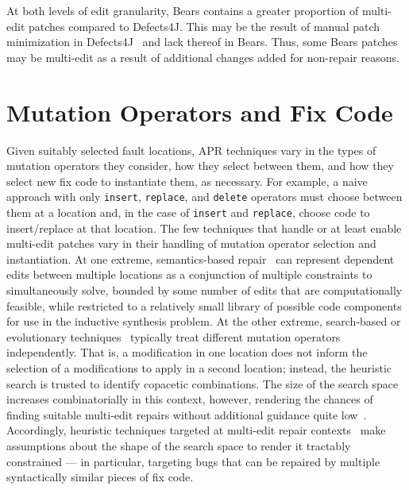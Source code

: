 \documentclass[sigconf, timestamp-false, anonymous=true]{acmart}
\begin{document}
At both levels of edit granularity, Bears contains a greater proportion of 
multi-edit patches compared to Defects4J. This may be the 
result of manual patch minimization in Defects4J~\cite{defects4j} 
and lack thereof in Bears.
Thus, some Bears patches may be multi-edit as a result of additional 
changes added for non-repair reasons.






\section{Mutation Operators and Fix Code}
\label{sec:mutops}

Given suitably selected fault locations, APR techniques vary in the types of
mutation operators they consider, how they select between them, and how they
select new fix code to instantiate them, as necessary.  For example, a naive
approach with only \texttt{insert}, \texttt{replace}, and \texttt{delete}
operators must choose between them at a location and, in the case of
\texttt{insert} and \texttt{replace}, choose code to insert/replace at that
location.  
%
The few techniques that handle or at least enable multi-edit patches vary in their
handling of mutation operator selection and instantiation.  At one
extreme, semantics-based repair~\cite{s3,angelix} can represent dependent edits between multiple
locations as a conjunction of multiple constraints to simultaneously solve,
bounded by some number of edits that are computationally feasible, while
restricted to a relatively small library of possible code components for use in
the inductive synthesis problem.    At the other extreme, search-based or
evolutionary techniques~\cite{genprog,others} typically treat different mutation
operators independently.  That is, a modification in one location does not
inform the selection of a modifications to apply in a second location; instead,
the heuristic search is trusted to identify copacetic combinations.  The size of
the search space increases combinatorially in this context, however, rendering
the chances of finding suitable multi-edit repairs without additional guidance
quite low~\cite{ae,long2016}. Accordingly, heuristic techniques targeted at multi-edit
repair contexts~\cite{hercules,maybewang2018} make assumptions about the
shape of the search space to render it tractably constrained --- in particular,
targeting bugs that can be repaired by multiple syntactically similar pieces of
fix code.
\end{document}
